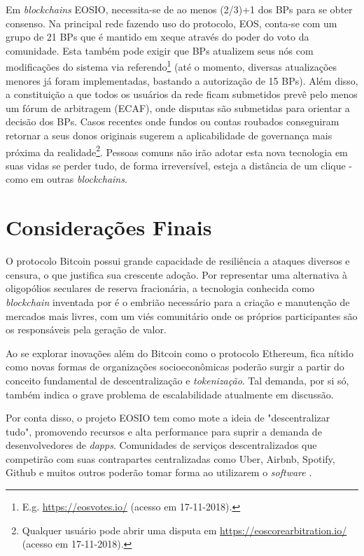\documentclass[a4paper,12pt]{monografia}
\theoremstyle{plain}
\theoremstyle{definition}
\theoremstyle{remark}
\begin{document}
Em \textit{blockchains} EOSIO, necessita-se de ao menos (2/3)+1 dos BPs para se obter consenso.
Na principal rede fazendo uso do protocolo, EOS, conta-se com um grupo de 21 BPs que \'e mantido em xeque atrav\'es do poder do voto da comunidade.
Esta tamb\'em pode exigir que BPs atualizem seus n\'os com modifica\c{c}\~oes do sistema via referendo\footnote{E.g. \url{https://eosvotes.io/} (acesso em 17-11-2018).} (at\'e o momento, diversas atualiza\c{c}\~oes menores j\'a foram implementadas, bastando a autoriza\c{c}\~ao de 15 BPs).
Al\'em disso, a constitui\c{c}\~ao a que todos os usu\'arios da rede ficam submetidos prev\^e pelo menos um f\'orum de arbitragem (ECAF), onde disputas s\~ao submetidas para orientar a decis\~ao dos BPs.
Casos recentes onde fundos ou contas roubados conseguiram retornar a seus donos originais sugerem a aplicabilidade de governan\c{c}a mais pr\'oxima da realidade\footnote{Qualquer usu\'ario pode abrir uma disputa em \url{https://eoscorearbitration.io/} (acesso em 17-11-2018).}.
Pessoas comuns n\~ao ir\~ao adotar esta nova tecnologia em suas vidas se perder tudo, de forma irrevers\'ivel, esteja a dist\^ancia de um clique - como em outras \textit{blockchains}.

\section{Considera\c{c}\~oes Finais}

O protocolo Bitcoin possui grande capacidade de resili\^{e}ncia a ataques diversos e censura, o que justifica sua crescente ado\c{c}\~{a}o.
Por representar uma alternativa \`{a} oligop\'{o}lios seculares de reserva fracion\'aria, a tecnologia conhecida como \textit{blockchain} inventada por  \'{e} o embri\~{a}o necess\'{a}rio para a cria\c{c}\~{a}o e manuten\c{c}\~{a}o de mercados mais livres, com um vi\'{e}s comunit\'{a}rio onde os pr\'{o}prios participantes s\~{a}o os respons\'{a}veis pela gera\c{c}\~{a}o de valor.

Ao se explorar inova\c{c}\~{o}es al\'{e}m do Bitcoin como o protocolo Ethereum, fica n\'{i}tido como novas formas de organiza\c{c}\~{o}es socioecon\^{o}micas poder\~{a}o surgir a partir do conceito fundamental de descentraliza\c{c}\~{a}o e \textit{tokeniza\c{c}\~{a}o}.
Tal demanda, por si s\'{o}, tamb\'{e}m indica o grave problema de escalabilidade atualmente em discuss\~{a}o.

Por conta disso, o projeto EOSIO tem como mote a ideia de "descentralizar tudo", promovendo recursos e alta performance para suprir a demanda de desenvolvedores de \textit{dapps}.
Comunidades de servi\c{c}os descentralizados que competir\~ao com suas contrapartes centralizadas como Uber, Airbnb, Spotify, Github e muitos outros poder\~ao tomar forma ao utilizarem o \textit{software} \cite{eos_intro}.
\end{document}
